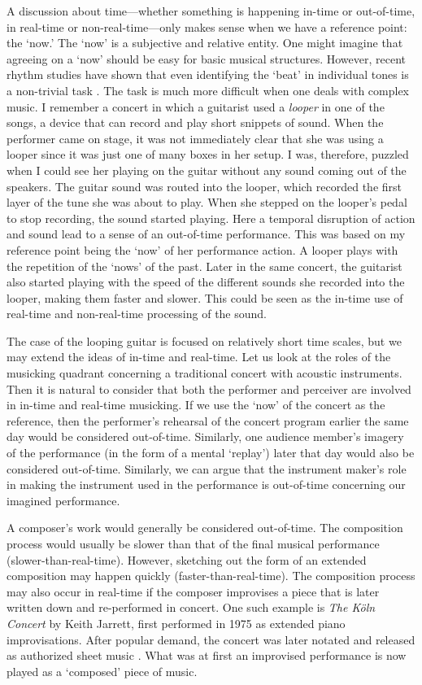 A discussion about time---whether something is happening in-time or out-of-time, in real-time or non-real-time---only makes sense when we have a reference point: the `now.' The `now' is a subjective and relative entity. One might imagine that agreeing on a `now' should be easy for basic musical structures. However, recent rhythm studies have shown that even identifying the `beat' in individual tones is a non-trivial task \citep{danielsen_where_2019}. The task is much more difficult when one deals with complex music. I remember a concert in which a guitarist used a \emph{looper} in one of the songs, a device that can record and play short snippets of sound. When the performer came on stage, it was not immediately clear that she was using a looper since it was just one of many boxes in her setup. I was, therefore, puzzled when I could see her playing on the guitar without any sound coming out of the speakers. The guitar sound was routed into the looper, which recorded the first layer of the tune she was about to play. When she stepped on the looper's pedal to stop recording, the sound started playing. Here a temporal disruption of action and sound lead to a sense of an out-of-time performance. This was based on my reference point being the `now' of her performance action. A looper plays with the repetition of the `nows' of the past. Later in the same concert, the guitarist also started playing with the speed of the different sounds she recorded into the looper, making them faster and slower. This could be seen as the in-time use of real-time and non-real-time processing of the sound.

The case of the looping guitar is focused on relatively short time scales, but we may extend the ideas of in-time and real-time. Let us look at the roles of the musicking quadrant concerning a traditional concert with acoustic instruments. Then it is natural to consider that both the performer and perceiver are involved in in-time and real-time musicking.
If we use the `now' of the concert as the reference, then the performer's rehearsal of the concert program earlier the same day would be considered out-of-time. Similarly, one audience member's imagery of the performance (in the form of a mental `replay') later that day would also be considered out-of-time.
Similarly, we can argue that the instrument maker's role in making the instrument used in the performance is out-of-time concerning our imagined performance.

A composer's work would generally be considered out-of-time. The composition process would usually be slower than that of the final musical performance (slower-than-real-time). However, sketching out the form of an extended composition may happen quickly (faster-than-real-time). The composition process may also occur in real-time if the composer improvises a piece that is later written down and re-performed in concert. One such example is \emph{The Köln Concert} by Keith Jarrett, first performed in 1975 as extended piano improvisations. After popular demand, the concert was later notated and released as authorized sheet music \citep{jarrett_koln_1991}. What was at first an improvised performance is now played as a `composed' piece of music.

